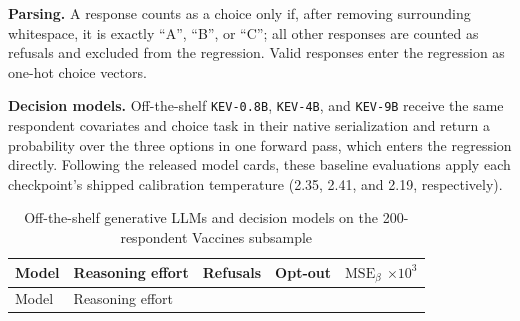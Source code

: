 \documentclass[
  11pt,
  letterpaper,
]{article}
\makeatletter
\newcommand\table@defaultsize{\footnotesize}
\let\table@size\table@defaultsize
\newcommand\nexttablesize[1]{\gdef\table@size{#1}}
\makeatother
\begin{document}
\textbf{Parsing.} A response counts as a choice only if, after removing
surrounding whitespace, it is exactly ``A'', ``B'', or ``C''; all other
responses are counted as refusals and excluded from the regression.
Valid responses enter the regression as one-hot choice vectors.

\textbf{Decision models.} Off-the-shelf \texttt{KEV-0.8B},
\texttt{KEV-4B}, and \texttt{KEV-9B} receive the same respondent
covariates and choice task in their native serialization and return a
probability over the three options in one forward pass, which enters the
regression directly. Following the released model cards, these baseline
evaluations apply each checkpoint's shipped calibration temperature
(2.35, 2.41, and 2.19, respectively).

\nexttablesize{\footnotesize}
{\def\LTcaptype{apptbl}
\begin{longtable}[]{@{}
  >{\raggedright\arraybackslash}p{}
  >{\raggedright\arraybackslash}p{}
  >{\raggedleft\arraybackslash}p{}
  >{\raggedleft\arraybackslash}p{}
  >{\raggedleft\arraybackslash}p{}@{}}
\caption{{\label{apptbl-llm-baseline}}Off-the-shelf generative LLMs and
decision models on the 200-respondent Vaccines subsample}\tabularnewline
\toprule\noalign{}
\begin{minipage}[b]{\linewidth}\raggedright
Model
\end{minipage} & \begin{minipage}[b]{\linewidth}\raggedright
Reasoning effort
\end{minipage} & \begin{minipage}[b]{\linewidth}\raggedleft
Refusals
\end{minipage} & \begin{minipage}[b]{\linewidth}\raggedleft
Opt-out
\end{minipage} & \begin{minipage}[b]{\linewidth}\raggedleft
\(\mathrm{MSE}_\beta\) \(\times 10^3\)
\end{minipage} \\
\midrule\noalign{}
\endfirsthead
\toprule\noalign{}
\begin{minipage}[b]{\linewidth}\raggedright
Model
\end{minipage} & \begin{minipage}[b]{\linewidth}\raggedright
Reasoning effort
\end{minipage} & \begin{minipage}[b]{\linewidth}\raggedleft

\end{minipage}
\end{longtable}}
\end{document}
